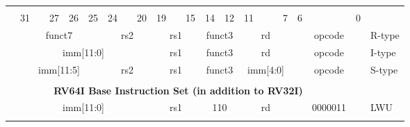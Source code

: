 \begin{table}[p]
\begin{small}
\begin{center}
    \begin{tabular} {p{0.002in}p{0.002in}p{0.002in}p{0.002in}p{0.002in}p{0.002in}p{0.002in}p{0.002in}p{0.002in}p{0.002in}p{0.002in}p{0.002in}p{0.002in}p{0.002in}p{0.002in}p{0.002in}p{0.002in}p{0.002in}p{0.002in}p{0.002in}p{0.002in}p{0.002in}p{0.002in}p{0.002in}p{0.002in}p{0.002in}p{0.002in}p{0.002in}p{0.002in}p{0.002in}p{0.002in}p{0.002in}p{0.002in}l}
    & & & & & & & & & & & & & & & & & & & & & & & & & & & & & & & & \\

            &

    \multicolumn{3}{l}{31} &
    \multicolumn{2}{r}{27} &
    \multicolumn{1}{c}{26} &
    \multicolumn{1}{r}{25} &
    \multicolumn{3}{l}{24} &
    \multicolumn{2}{r}{20} &
    \multicolumn{3}{l}{19} &
    \multicolumn{2}{r}{15} &
    \multicolumn{2}{l}{14} &
    \multicolumn{1}{r}{12} &
    \multicolumn{4}{l}{11} &
    \multicolumn{1}{r}{7} &
    \multicolumn{6}{l}{6} &
    \multicolumn{1}{r}{0} \\
    \cline{2-33}
&


\multicolumn{7}{|c|}{funct7} &
\multicolumn{5}{c|}{rs2} &
\multicolumn{5}{c|}{rs1} &
\multicolumn{3}{c|}{funct3} &
\multicolumn{5}{c|}{rd} &
\multicolumn{7}{|c|}{opcode} & R-type \\
\cline{2-33}
&

\multicolumn{12}{|c|}{imm[11:0]} &
\multicolumn{5}{c|}{rs1} &
\multicolumn{3}{c|}{funct3} &
\multicolumn{5}{c|}{rd} &
\multicolumn{7}{|c|}{opcode} & I-type \\
\cline{2-33}
&

\multicolumn{7}{|c|}{imm[11:5]} &
\multicolumn{5}{c|}{rs2} &
\multicolumn{5}{c|}{rs1} &
\multicolumn{3}{c|}{funct3} &
\multicolumn{5}{c|}{imm[4:0]} &
\multicolumn{7}{|c|}{opcode} & S-type \\
\cline{2-33}
&




\multicolumn{32}{c}{} & \\
\multicolumn{32}{c}{\bfseries RV64I Base Instruction Set (in addition to RV32I) } & \\
\cline{2-33}

            &
\multicolumn{12}{|c|}{imm[11:0]} &
\multicolumn{5}{c|}{rs1} &
\multicolumn{3}{c|}{110} &
\multicolumn{5}{c|}{rd} &
\multicolumn{7}{|c|}{0000011} & LWU \\
\cline{2-33}
&


\end{tabular}
\end{center}
\end{small}
\end{table}
